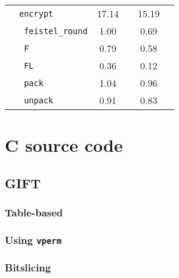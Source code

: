 \begin{table}[!htpb]
\begin{tabular}{llcccc}
                                                & \texttt{encrypt} & 17.14 & & 15.19 & \\
        \cmidrule(lr){2-2}
                                                & \texttt{ feistel\_round} & 1.00 & & 0.69 & \\
                                                & \texttt{ F} & 0.79 & & 0.58 & \\
                                                & \texttt{ FL} & 0.36 & & 0.12 & \\
                                                & \texttt{ pack} & 1.04 & & 0.96 & \\
                                                & \texttt{ unpack} & 0.91 & & 0.83 & \\
        \bottomrule
    \end{tabular}
\end{table}

\chapter{C source code}
\label{app:cimpl}

\section{GIFT}
\subsection{Table-based}




\subsection{Using \texttt{vperm}}




\subsection{Bitslicing}




